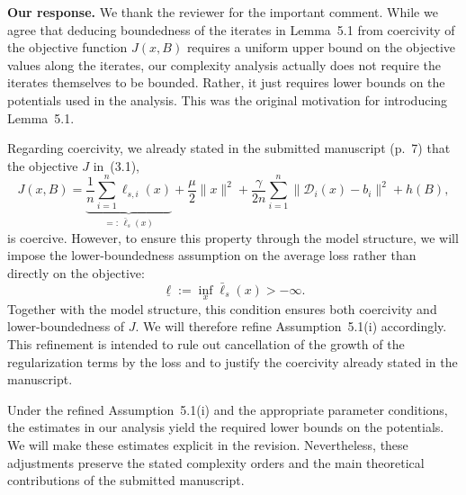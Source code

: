 \documentclass[11pt]{article}
\begin{document}

\vspace{0.5em}
\noindent\textbullet\quad\textbf{Our response.}
We thank the reviewer for the important comment. While we agree that deducing boundedness of the iterates in Lemma~5.1 from coercivity of the objective function $J(x, B)$ requires a uniform upper bound on the objective values along the iterates, our complexity analysis actually does not require the iterates themselves to be bounded. Rather, it just requires lower bounds on the potentials used in the analysis. This was the original motivation for introducing Lemma~5.1.

Regarding coercivity, we already stated in the submitted manuscript
(p.~7) that the objective $J$ in~(3.1),
\[
J(x,B)=
\underbrace{\frac1n\sum_{i=1}^n\ell_{s,i}(x)}_{=:\,\bar{\ell}_s(x)}
+\frac{\mu}{2}\|x\|^2
+\frac{\gamma}{2n}\sum_{i=1}^n\|\mathcal D_i(x)-b_i\|^2
+h(B),
\]
is coercive. However, to ensure this property through the model
structure, we will impose the lower-boundedness assumption on
the average loss rather than directly on the objective:
\[
\underline{\ell}:=\inf_x\bar{\ell}_s(x)>-\infty.
\]
Together with the model structure, this condition ensures both
coercivity and lower-boundedness of $J$. We will therefore refine
Assumption~5.1(i) accordingly. This refinement is intended to
rule out cancellation of the growth of the regularization terms
by the loss and to justify the coercivity already stated in
the manuscript.

Under the refined Assumption~5.1(i) and the
appropriate parameter conditions, the estimates in our analysis
yield the required lower bounds on the potentials. We will make
these estimates explicit in the revision. Nevertheless, these
adjustments preserve the stated complexity orders and the main
theoretical contributions of the submitted manuscript.
\end{document}
